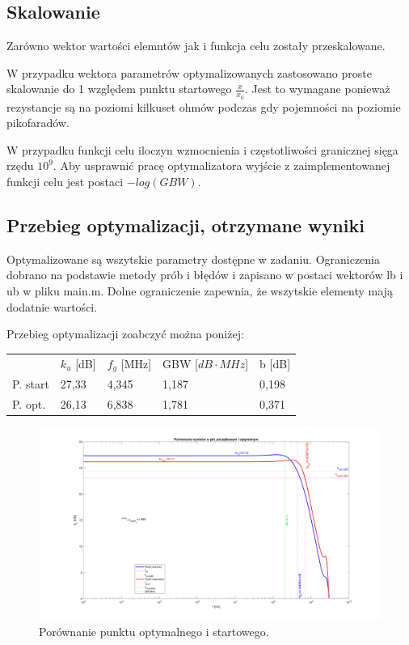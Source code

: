 \documentclass{article}
\begin{document}
\subsection*{Skalowanie}
Zarówno wektor wartości elemntów jak i funkcja celu zostały przeskalowane. 

W przypadku wektora parametrów optymalizowanych zastosowano proste skalowanie do 1 względem punktu startowego $\frac{x}{x_0}$.
Jest to wymagane ponieważ rezystancje są na poziomi kilkuset ohmów podczas gdy pojemności na poziomie pikofaradów.

W przypadku funkcji celu iloczyn wzmocnienia i częstotliwości granicznej sięga rzędu $10^9$. 
Aby usprawnić pracę optymalizatora wyjście z zaimplementowanej funkcji celu jest postaci $-log(GBW)$.
\pagebreak
\subsection{Przebieg optymalizacji, otrzymane wyniki}
Optymalizowane są wszytskie parametry dostępne w zadaniu. Ograniczenia dobrano na podstawie metody prób i błędów i zapisano w postaci wektorów lb i ub w pliku main.m.
Dolne ograniczenie zapewnia, że wszytskie elementy mają dodatnie wartości. 

Przebieg optymalizacji zoabczyć można poniżej:

\begin{table}[h]
	\centering
	\begin{tabular}{lllll}
		   & $k_u$ {[}dB{]} & $f_g$ {[}MHz{]} & GBW {[}$dB \cdot MHz${]} & b {[}dB{]} \\
	P. start   & 27,33         & 4,345          & 1,187                                 & 0,198      \\
	P. opt. & 26,13         & 6,838          & 1,781                                 & 0,371     
	\end{tabular}
	\end{table}


\begin{figure}[h]
	\includegraphics[width=12cm]{graphics/comparison.png}
	\centering
	\caption{Porównanie punktu optymalnego i startowego.}
\end{figure}
\end{document}
